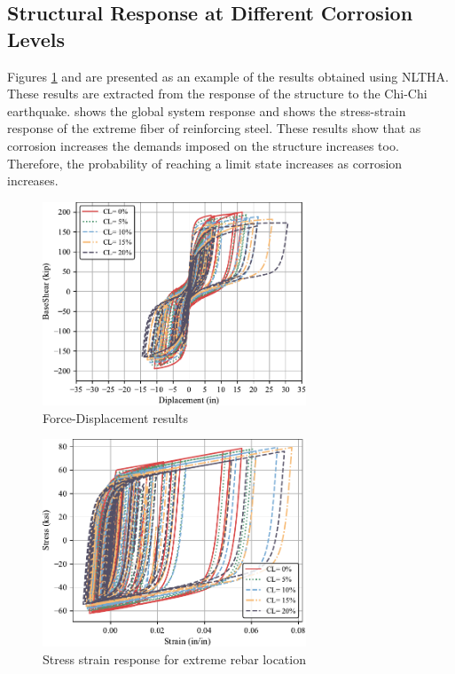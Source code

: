 \subsection{Structural Response at Different Corrosion Levels}
Figures \ref{fig:Force-Displacement_Results} and  are presented as an example of the results obtained using NLTHA. These results are extracted from the response of the structure to the Chi-Chi earthquake.  shows the global system response and  shows the stress-strain response of the extreme fiber of reinforcing steel. These results show that as corrosion increases the demands imposed on the structure increases too. Therefore, the probability of reaching a limit state increases as corrosion increases.

\begin{figure}[htbp]
	\centering
	\includegraphics[width=0.7\textwidth]{Chapter-5/figs/Force_Diplacement_RSN1505.pdf}
	\caption{Force-Displacement results}
	\label{fig:Force-Displacement_Results}
\end{figure}

\begin{figure}[htbp]
	\centering
	\includegraphics[width=0.7\textwidth]{Chapter-5/figs/Stress_Strain_RSN1505.pdf}
	\caption{Stress strain response for extreme rebar location}
	\label{fig:Steel_Stress_Strain_Response}
\end{figure}

